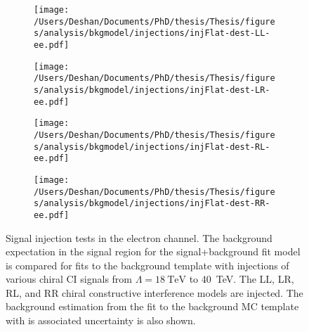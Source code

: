 \begin{figure}[h!]
    \centering
    \begin{subfigure}[b]{0.49\textwidth}
        \centering
        \texttt{[image: /Users/Deshan/Documents/PhD/thesis/Thesis/figures/analysis/bkgmodel/injections/injFlat-dest-LL-ee.pdf]}
        \label{fig:bkgmodel:injee2}
    \end{subfigure}
    \begin{subfigure}[b]{0.49\textwidth}
        \centering
        \texttt{[image: /Users/Deshan/Documents/PhD/thesis/Thesis/figures/analysis/bkgmodel/injections/injFlat-dest-LR-ee.pdf]}
        \label{fig:bkgmodel:injee4}
    \end{subfigure}
    \begin{subfigure}[b]{0.49\textwidth}
        \centering
        \texttt{[image: /Users/Deshan/Documents/PhD/thesis/Thesis/figures/analysis/bkgmodel/injections/injFlat-dest-RL-ee.pdf]}
        \label{fig:bkgmodel:injee6}
    \end{subfigure}
    \begin{subfigure}[b]{0.49\textwidth}
        \centering
        \texttt{[image: /Users/Deshan/Documents/PhD/thesis/Thesis/figures/analysis/bkgmodel/injections/injFlat-dest-RR-ee.pdf]}
        \label{fig:bkgmodel:injee8}
    \end{subfigure}
    \caption[Signal injection tests in the electron channel for destructive interference models]{Signal injection tests in the electron channel. The background expectation in the signal region for the signal+background fit model is compared for fits to the background template with injections of various chiral CI signals from $\Lambda = \SI{18}{\tera\electronvolt}$ to \SI{40}{\tera\electronvolt}. The LL, LR, RL, and RR chiral constructive interference models are injected. The background estimation from the fit to the background MC template with is associated uncertainty is also shown.}
    \label{fig:bkgmodel:injeedest}
\end{figure}


